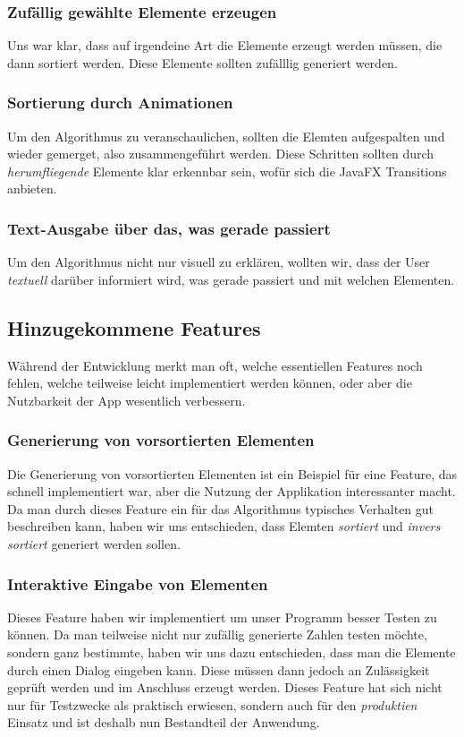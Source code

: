 \subsubsection{Zufällig gewählte Elemente erzeugen}
Uns war klar, dass auf irgendeine Art die Elemente erzeugt werden müssen, die dann sortiert werden. Diese Elemente sollten zufälllig generiert werden.

\subsubsection{Sortierung durch Animationen}
Um den Algorithmus zu veranschaulichen, sollten die Elemten aufgespalten und wieder gemerget, also zusammengeführt werden. Diese Schritten sollten durch \textit{herumfliegende} Elemente klar erkennbar sein, wofür sich die JavaFX Transitions anbieten.

\subsubsection{Text-Ausgabe über das, was gerade passiert}
Um den Algorithmus nicht nur visuell zu erklären, wollten wir, dass der User \textit{textuell} darüber informiert wird, was gerade passiert und mit welchen Elementen.

\subsection{Hinzugekommene Features}
Während der Entwicklung merkt man oft, welche essentiellen Features noch fehlen, welche teilweise leicht implementiert werden können, oder aber die Nutzbarkeit der App wesentlich verbessern.
\subsubsection{Generierung von vorsortierten Elementen}
Die Generierung von vorsortierten Elementen ist ein Beispiel für eine Feature, das schnell implementiert war, aber die Nutzung der Applikation interessanter macht. Da man durch dieses Feature ein für das Algorithmus typisches Verhalten gut beschreiben kann, haben wir uns entschieden, dass Elemten \textit{sortiert} und \textit{invers sortiert} generiert werden sollen.

\subsubsection{Interaktive Eingabe von Elementen}
Dieses Feature haben wir implementiert um unser Programm besser Testen zu können. Da man teilweise nicht nur zufällig generierte Zahlen testen möchte, sondern ganz bestimmte, haben wir uns dazu entschieden, dass man die Elemente durch einen Dialog eingeben kann. Diese müssen dann jedoch an Zulässigkeit geprüft werden und im Anschluss erzeugt werden. Dieses Feature hat sich nicht nur für Testzwecke als praktisch erwiesen, sondern auch für den \textit{produktien} Einsatz und ist deshalb nun Bestandteil der Anwendung.

